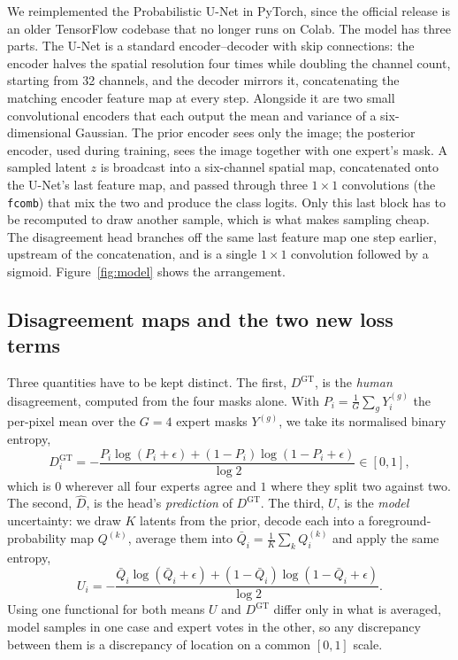 \documentclass[10pt]{article}
\newcommand{\Dgt}{D^{\mathrm{GT}}}
\begin{document}
We reimplemented the Probabilistic U-Net in PyTorch, since the official release
is an older TensorFlow codebase that no longer runs on Colab. The model has three
parts. The U-Net is a standard encoder--decoder with skip connections: the
encoder halves the spatial resolution four times while doubling the channel
count, starting from 32 channels, and the decoder mirrors it, concatenating the
matching encoder feature map at every step. Alongside it are two small
convolutional encoders that each output the mean and variance of a
six-dimensional Gaussian. The prior encoder sees only the image; the posterior
encoder, used during training, sees the image together with one expert's mask. A
sampled latent $z$ is broadcast into a six-channel spatial map, concatenated onto
the U-Net's last feature map, and passed through three $1\times1$ convolutions
(the \texttt{fcomb}) that mix the two and produce the class logits. Only this
last block has to be recomputed to draw another sample, which is what makes
sampling cheap. The disagreement head branches off the
same last feature map one step earlier, upstream of the concatenation, and is a
single $1\times1$ convolution followed by a sigmoid. Figure~\ref{fig:model} shows the arrangement.



\subsection{Disagreement maps and the two new loss terms}

Three quantities have to be kept distinct. The first, $\Dgt$, is the \emph{human}
disagreement, computed from the four masks alone. With
$P_i=\frac{1}{G}\sum_g Y_i^{(g)}$ the per-pixel mean over the $G=4$ expert masks
$Y^{(g)}$, we take its normalised binary entropy,
\[
  \Dgt_i=-\frac{P_i\log(P_i+\epsilon)+(1-P_i)\log(1-P_i+\epsilon)}{\log 2}\in[0,1],
\]
which is $0$ wherever all four experts agree and $1$ where they split two against
two. The second, $\hat D$, is the head's \emph{prediction} of $\Dgt$. The third,
$U$, is the \emph{model} uncertainty: we draw $K$ latents from the prior, decode
each into a foreground-probability map $Q^{(k)}$, average them into
$\bar Q_i=\frac{1}{K}\sum_k Q_i^{(k)}$ and apply the same entropy,
\[
  U_i=-\frac{\bar Q_i\log(\bar Q_i+\epsilon)+(1-\bar Q_i)\log(1-\bar Q_i+\epsilon)}{\log 2}.
\]
Using one functional for both means $U$ and $\Dgt$ differ only in what is
averaged, model samples in one case and expert votes in the other, so any
discrepancy between them is a discrepancy of location on a common $[0,1]$ scale.
\end{document}
